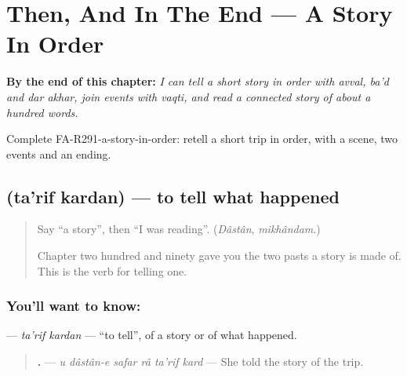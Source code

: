 
\chapter{Then, And In The End --- A Story In Order}
\label{ch:fa-a-story-in-order}

\begin{chapteropening}
\textbf{By the end of this chapter:} \emph{I can tell a short story in order with avval, ba'd and dar akhar, join events with vaqti, and read a connected story of about a hundred words.}

Complete FA-R291-a-story-in-order: retell a short trip in order, with a scene, two events and an ending.
\end{chapteropening}

\section[\texorpdfstring{\fa{تعریف} \fa{کردن} (ta'rif kardan)}{تعریف کردن (ta'rif kardan)}]{  (ta'rif kardan) — to tell what happened}

\label{lesson:FA-C291-tarif-kardan}



\begin{quote}
Say \textquotedblleft{}a story\textquotedblright{}, then \textquotedblleft{}I was reading\textquotedblright{}. (\emph{Dâstân}, \emph{mikhândam}.)

Chapter two hundred and ninety gave you the two pasts a story is made of. This is the verb for telling one.
\end{quote}

\subsection*{You'll want to know:  }
\textbf{ } — \emph{ta'rif kardan} — \textquotedblleft{}to tell\textquotedblright{}, of a story or of what happened.

\begin{quote}
\textbf{     .} — \emph{u dâstân-e safar râ ta'rif kard} — She told the story of the trip.
\end{quote}

